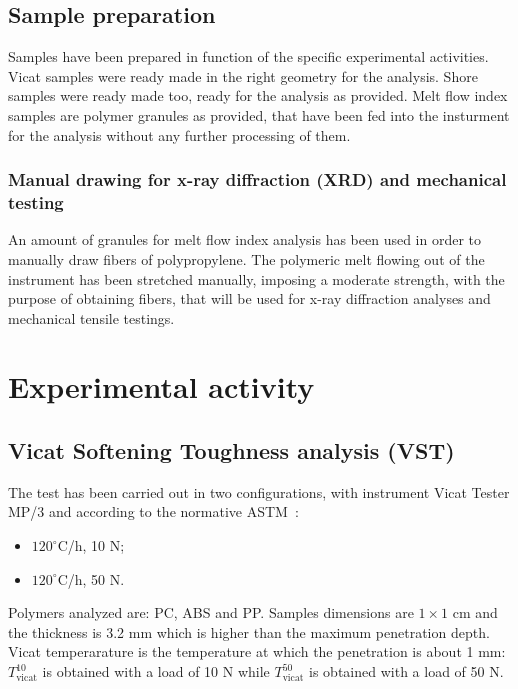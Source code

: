 \documentclass[a4paper, 11pt]{article}
\begin{document}
\subsection{Sample preparation}

Samples have been prepared in function of the specific experimental activities. Vicat samples were ready made in the right geometry for the analysis. Shore samples were ready made too, ready for the analysis as provided. Melt flow index samples are polymer granules as provided, that have been fed into the insturment for the analysis without any further processing of them. 

\subsubsection{Manual drawing for x-ray diffraction (XRD) and mechanical testing}

An amount of granules for melt flow index analysis has been used in order to manually draw fibers of polypropylene. The polymeric melt flowing out of the instrument has been stretched manually, imposing a moderate strength, with the purpose of obtaining fibers, that will be used for x-ray diffraction analyses and mechanical tensile testings.  

\section{Experimental activity}

\subsection{Vicat Softening Toughness analysis (VST)}

The test has been carried out in two configurations, with instrument Vicat Tester MP/3 and according to the normative ASTM~\cite{VICAT}:

\begin{itemize}

\item $120^\circ$C/h, 10 N;

\item $120^\circ$C/h, 50 N.

\end{itemize}
Polymers analyzed are: PC, ABS and PP. Samples dimensions are $1\times1$ cm and the thickness is 3.2 mm which is higher than the maximum penetration depth. Vicat temperarature is the temperature at which the penetration is about 1 mm: $T_\text{vicat}^\text{10}$ is obtained with a load of 10 N while $T_\text{vicat}^\text{50}$ is obtained with a load of 50 N. 
\end{document}
